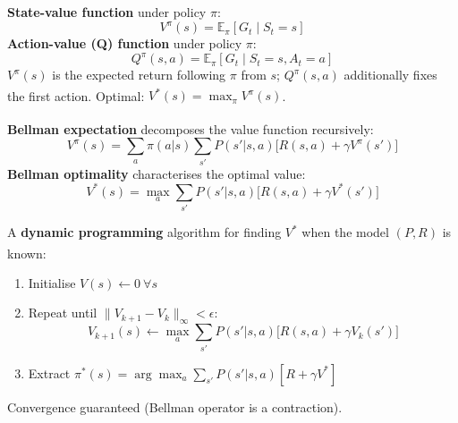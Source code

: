 \begin{tcbitemize}[ skin=sectionraster ]
        \tcbitem[title=Value Functions, raster multicolumn=3]
        \textbf{State-value function} under policy $\pi$:
        \begin{equation}
            V^{\pi}(s) = \mathbb{E}_{\pi}\!\left[G_t \mid S_t = s\right]
        \end{equation}
        \textbf{Action-value (Q) function} under policy $\pi$:
        \begin{equation}
            Q^{\pi}(s, a) = \mathbb{E}_{\pi}\!\left[G_t \mid S_t = s, A_t = a\right]
        \end{equation}
        $V^{\pi}(s)$ is the expected return following $\pi$ from $s$;
        $Q^{\pi}(s,a)$ additionally fixes the first action.
        Optimal: $V^*(s) = \max_\pi V^\pi(s)$.\textsuperscript{\cite[][p.~143]{barberBayesianReasoningMachine2012}}

        \tcbitem[title=Bellman Equations, raster multicolumn=3]
        \textbf{Bellman expectation} decomposes the value function
        recursively:\textsuperscript{\cite[][p.~145]{barberBayesianReasoningMachine2012}}
        \begin{equation}
            V^{\pi}(s) = \sum_a \pi(a|s) \sum_{s'} P(s'|s,a)
                         \bigl[R(s,a) + \gamma V^{\pi}(s')\bigr]
        \end{equation}
        \textbf{Bellman optimality} characterises the optimal value:
        \begin{equation}
            V^*(s) = \max_a \sum_{s'} P(s'|s,a)
                     \bigl[R(s,a) + \gamma V^*(s')\bigr]
        \end{equation}

        \tcbitem[title=Value Iteration, raster multicolumn=3]
        A \textbf{dynamic programming} algorithm for finding $V^*$ when the
        model $(P, R)$ is
        known:\textsuperscript{\cite[][p.~153]{barberBayesianReasoningMachine2012}}
        \begin{enumerate}
            \item Initialise $V(s) \leftarrow 0\ \forall s$
            \item Repeat until $\|V_{k+1} - V_k\|_\infty < \epsilon$:
            \begin{equation}
                V_{k+1}(s) \leftarrow \max_a \sum_{s'} P(s'|s,a)
                           \bigl[R(s,a) + \gamma V_k(s')\bigr]
            \end{equation}
            \item Extract $\pi^*(s) = \arg\max_a \sum_{s'} P(s'|s,a)[R + \gamma V^*]$
        \end{enumerate}
        Convergence guaranteed (Bellman operator is a contraction).


\end{tcbitemize}
